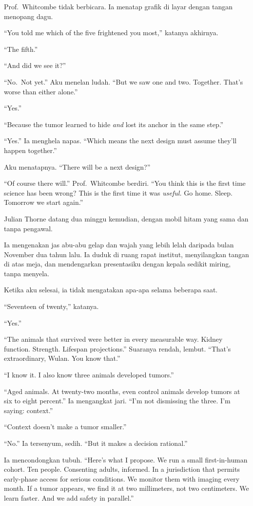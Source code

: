 \documentclass[11pt,twoside,openany]{book}
\makeatletter
\newcommand{\scenebreak}{\par\vspace{0.9em}{\centering\textsc{*\hspace{0.7em}*\hspace{0.7em}*}\par}\vspace{0.9em}\@afterindentfalse\@afterheading}
\makeatother
\begin{document}
Prof.~Whitcombe tidak berbicara. Ia menatap grafik di layar dengan tangan menopang dagu.

``You told me which of the five frightened you most,'' katanya akhirnya.

``The fifth.''

``And did we see it?''

``No.~Not yet.'' Aku menelan ludah. ``But we saw one and two. Together. That's worse than either alone.''

``Yes.''

``Because the tumor learned to hide \emph{and} lost its anchor in the same step.''

``Yes.'' Ia menghela napas. ``Which means the next design must assume they'll happen together.''

Aku menatapnya. ``There will be a next design?''

``Of course there will.'' Prof.~Whitcombe berdiri. ``You think this is the first time science has been wrong? This is the first time it was \emph{useful.} Go home. Sleep. Tomorrow we start again.''

\scenebreak
Julian Thorne datang dua minggu kemudian, dengan mobil hitam yang sama dan tanpa pengawal.

Ia mengenakan jas abu-abu gelap dan wajah yang lebih lelah daripada bulan November dua tahun lalu. Ia duduk di ruang rapat institut, menyilangkan tangan di atas meja, dan mendengarkan presentasiku dengan kepala sedikit miring, tanpa menyela.

Ketika aku selesai, ia tidak mengatakan apa-apa selama beberapa saat.

``Seventeen of twenty,'' katanya.

``Yes.''

``The animals that survived were better in every measurable way. Kidney function. Strength. Lifespan projections.'' Suaranya rendah, lembut. ``That's extraordinary, Wulan. You know that.''

``I know it. I also know three animals developed tumors.''

``Aged animals. At twenty-two months, even control animals develop tumors at six to eight percent.'' Ia mengangkat jari. ``I'm not dismissing the three. I'm saying: context.''

``Context doesn't make a tumor smaller.''

``No.'' Ia tersenyum, sedih. ``But it makes a decision rational.''

Ia mencondongkan tubuh. ``Here's what I propose. We run a small first-in-human cohort. Ten people. Consenting adults, informed. In a jurisdiction that permits early-phase access for serious conditions. We monitor them with imaging every month. If a tumor appears, we find it at two millimeters, not two centimeters. We learn faster. And we add safety in parallel.''
\end{document}
